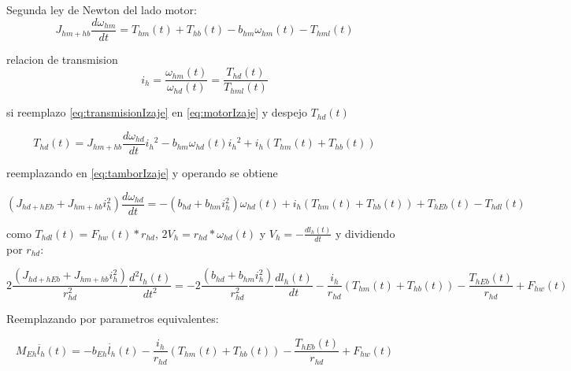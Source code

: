 \documentclass{article}
\begin{document}
            Segunda ley de Newton del lado motor:
            \begin{equation} \label{eq:motorIzaje}
                J_{hm+hb} \frac{d \omega_{hm}}{dt} = T_{hm}(t) + T_{hb}(t) - b_{hm} \omega_{hm}(t) - T_{hml}(t)
            \end{equation}

            relacion de transmision
            \begin{equation} \label{eq:transmisionIzaje}
                i_h = \frac{\omega_{hm}(t)}{\omega_{hd}(t)} = \frac{T_{hd}(t)}{T_{hml}(t)}
            \end{equation}

            si reemplazo \ref{eq:transmisionIzaje} en \ref{eq:motorIzaje} y despejo $T_{hd}(t)$

            \begin{equation} \label{eq:Thd}
                T_{hd}(t) = J_{hm+hb} \frac{d \omega_{hd}}{dt} {i_h}^2 - b_{hm} \omega_{hd}(t) {i_h}^2 + i_h (T_{hm}(t) + T_{hb}(t))
            \end{equation}

            reemplazando en \ref{eq:tamborIzaje} y operando se obtiene

            \begin{equation} \label{eq:izajeThdl}
                (J_{hd+hEb} + J_{hm+hb} i_h^2) \frac{d \omega_{hd}}{dt} = - (b_{hd} + b_{hm}i_h^2) \omega_{hd}(t) + i_h (T_{hm}(t) + T_{hb}(t)) + T_{hEb}(t) - T_{hdl}(t)
            \end{equation}

            como $T_{hdl}(t) = F_{hw}(t)*r_{hd}$, $2V_h = r_{hd}*\omega_{hd}(t)$ y $V_h = -\frac{dl_h(t)}{dt}$ y dividiendo por $r_{hd}$:

            \begin{equation} \label{eq:izajeFhw}
                2\frac{(J_{hd+hEb} + J_{hm+hb} i_h^2)}{r_{hd}^2} \frac{d^2 l_h(t)}{dt^2} = - 2\frac{(b_{hd} + b_{hm}i_h^2)}{r_{hd}^2} \frac{d l_h(t)}{dt} - \frac{i_h}{r_{hd}} (T_{hm}(t) + T_{hb}(t)) - \frac{T_{hEb}(t)}{r_{hd}} + F_{hw}(t)
            \end{equation}
            
            Reemplazando por parametros equivalentes:
            
            \begin{equation} \label{eq:izajeEquiv}
                M_{Eh} \ddot{l_h}(t) = - b_{Eh} \dot{l_h}(t) - \frac{i_h}{r_{hd}} (T_{hm}(t) + T_{hb}(t)) - \frac{T_{hEb}(t)}{r_{hd}} + F_{hw}(t)
            \end{equation}
\end{document}

